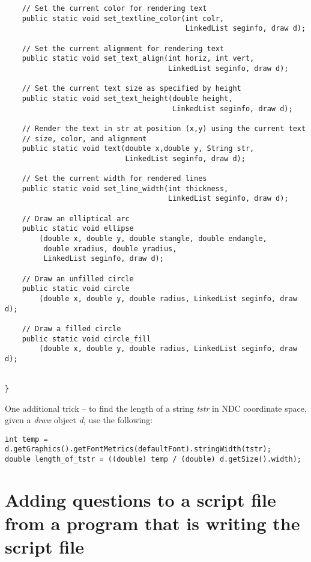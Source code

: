 \documentclass[12pt]{article}
\begin{document}
\begin{verbatim}
    // Set the current color for rendering text
    public static void set_textline_color(int colr, 
                                          LinkedList seginfo, draw d); 
 
    // Set the current alignment for rendering text
    public static void set_text_align(int horiz, int vert, 
                                      LinkedList seginfo, draw d); 
   
    // Set the current text size as specified by height
    public static void set_text_height(double height, 
                                       LinkedList seginfo, draw d); 
  
    // Render the text in str at position (x,y) using the current text
    // size, color, and alignment
    public static void text(double x,double y, String str, 
                            LinkedList seginfo, draw d); 
  
    // Set the current width for rendered lines
    public static void set_line_width(int thickness, 
                                      LinkedList seginfo, draw d); 

    // Draw an elliptical arc
    public static void ellipse
        (double x, double y, double stangle, double endangle, 
         double xradius, double yradius, 
         LinkedList seginfo, draw d);    

    // Draw an unfilled circle
    public static void circle
        (double x, double y, double radius, LinkedList seginfo, draw d); 

    // Draw a filled circle
    public static void circle_fill
        (double x, double y, double radius, LinkedList seginfo, draw d); 


}
\end{verbatim}

\noindent
One additional trick -- to find the length of a string \textit{tstr}
in NDC coordinate space, given a \textit{draw} object \textit{d}, use
the following:

\begin{verbatim}
int temp = d.getGraphics().getFontMetrics(defaultFont).stringWidth(tstr);
double length_of_tstr = ((double) temp / (double) d.getSize().width);
\end{verbatim}
\newpage
\section{Adding questions to a script file from a program that is writing the script file}
\end{document}
